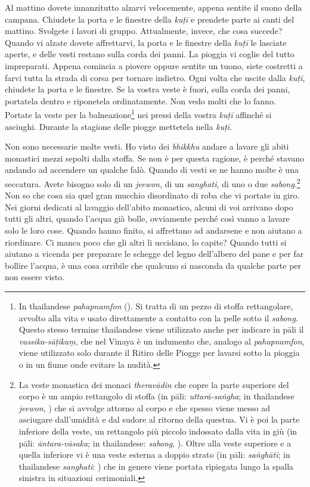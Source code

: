 Al mattino dovete innanzitutto alzarvi velocemente, appena sentite il
suono della campana. Chiudete la porta e le finestre della \emph{kuṭī} e
prendete parte ai canti del mattino. Svolgete i lavori di gruppo.
Attualmente, invece, che cosa succede? Quando vi alzate dovete
affrettarvi, la porta e le finestre della \emph{kuṭī} le lasciate
aperte, e delle vesti restano sulla corda dei panni. La pioggia vi
coglie del tutto impreparati. Appena comincia a piovere oppure sentite
un tuono, siete costretti a farvi tutta la strada di corsa per tornare
indietro. Ogni volta che uscite dalla \emph{kuṭī}, chiudete la porta e
le finestre. Se la vostra veste è fuori, sulla corda dei panni,
portatela dentro e riponetela ordinatamente. Non vedo molti che lo
fanno. Portate la veste per la balneazione\footnote{In thailandese
  \emph{pahapnamfon} (). Si tratta di un pezzo di stoffa
  rettangolare, avvolto alla vita e usato direttamente a contatto con la
  pelle sotto il \emph{sabong}. Questo stesso termine thailandese viene
  utilizzato anche per indicare in pāli il \emph{vassika-sāṭikaṃ}, che
  nel Vinaya è un indumento che, analogo al \emph{pahapnamfon}, viene
  utilizzato solo durante il Ritiro delle Piogge per lavarsi sotto la
  pioggia o in un fiume onde evitare la nudità.} nei pressi della vostra
\emph{kuṭī} affinché si asciughi. Durante la stagione delle piogge
mettetela nella \emph{kuṭī}.

Non sono necessarie molte vesti. Ho visto dei \emph{bhikkhu} andare a
lavare gli abiti monastici mezzi sepolti dalla stoffa. Se non è per
questa ragione, è perché stavano andando ad accendere un qualche falò.
Quando di vesti se ne hanno molte è una seccatura. Avete bisogno solo di
un \emph{jeewon}, di un \emph{sanghati}, di uno o due
\emph{sabong}.\footnote{La veste monastica dei monaci \emph{theravādin}
  che copre la parte superiore del corpo è un ampio rettangolo di stoffa
  (in pāli: \emph{uttarā-saṅgha}; in thailandese \emph{jeewon}, )
  che si avvolge attorno al corpo e che spesso viene messo ad asciugare
  dall'umidità e dal sudore al ritorno della questua. Vi è poi la parte
  inferiore della veste, un rettangolo più piccolo indossato dalla vita
  in giù (in pāli: \emph{āntara-vāsaka}; in thailandese: \emph{sabong},
  ). Oltre alla veste superiore e a quella inferiore vi è una veste
  esterna a doppio strato (in pāli: \emph{saṅghāti}; in thailandese
  \emph{sanghati}: ) che in genere viene portata ripiegata lungo
  la spalla sinistra in situazioni cerimoniali.} Non so che cosa sia
quel gran mucchio disordinato di roba che vi portate in giro. Nei giorni
dedicati al lavaggio dell'abito monastico, alcuni di voi arrivano dopo
tutti gli altri, quando l'acqua già bolle, ovviamente perché così vanno
a lavare solo le loro cose. Quando hanno finito, si affrettano ad
andarsene e non aiutano a riordinare. Ci manca poco che gli altri li
uccidano, lo capite? Quando tutti si aiutano a vicenda per preparare le
schegge del legno dell'albero del pane e per far bollire l'acqua, è una
cosa orribile che qualcuno si nasconda da qualche parte per non essere
visto.

